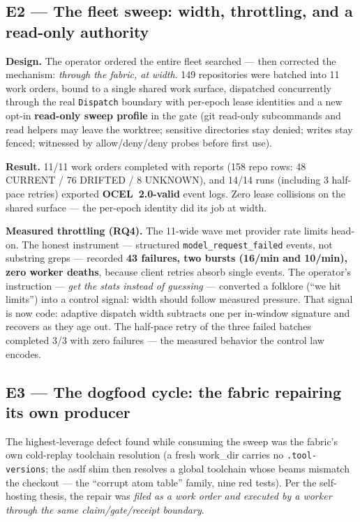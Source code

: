 \documentclass[11pt,a4paper]{article}
\theoremstyle{remark}
\newcommand{\term}[1]{\texttt{#1}}
\begin{document}
\subsection{E2 --- The fleet sweep: width, throttling, and a read-only authority}
\textbf{Design.} The operator ordered the entire fleet searched --- then corrected the mechanism: \emph{through the fabric, at width}. 149 repositories were batched into 11 work orders, bound to a single shared work surface, dispatched concurrently through the real \term{Dispatch} boundary with per-epoch lease identities and a new opt-in \textbf{read-only sweep profile} in the gate (git read-only subcommands and read helpers may leave the worktree; sensitive directories stay denied; writes stay fenced; witnessed by allow/deny/deny probes before first use).

\textbf{Result.} 11/11 work orders completed with reports (158 repo rows: 48 CURRENT / 76 DRIFTED / 8 UNKNOWN), and 14/14 runs (including 3 half-pace retries) exported \textbf{OCEL~2.0-valid} event logs. Zero lease collisions on the shared surface --- the per-epoch identity did its job at width.

\textbf{Measured throttling (RQ4).} The 11-wide wave met provider rate limits head-on. The honest instrument --- structured \term{model\_request\_failed} events, not substring greps --- recorded \textbf{43 failures, two bursts (16/min and 10/min), zero worker deaths}, because client retries absorb single events. The operator's instruction --- \emph{get the stats instead of guessing} --- converted a folklore (``we hit limits'') into a control signal: width should follow measured pressure. That signal is now code: adaptive dispatch width subtracts one per in-window signature and recovers as they age out. The half-pace retry of the three failed batches completed 3/3 with zero failures --- the measured behavior the control law encodes.

\subsection{E3 --- The dogfood cycle: the fabric repairing its own producer}
The highest-leverage defect found while consuming the sweep was the fabric's own cold-replay toolchain resolution (a fresh work\_dir carries no \term{.tool-versions}; the asdf shim then resolves a global toolchain whose beams mismatch the checkout --- the ``corrupt atom table'' family, nine red tests). Per the self-hosting thesis, the repair was \emph{filed as a work order and executed by a worker through the same claim/gate/receipt boundary}.
\end{document}
